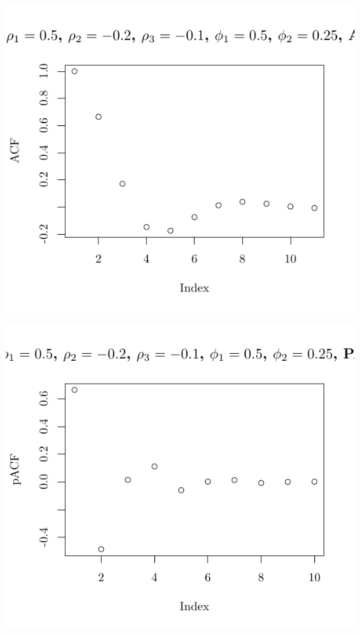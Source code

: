 \documentclass[10pt]{paper}\usepackage[]{graphicx}\usepackage[]{color}
\makeatletter
\def\maxwidth{ %
  \ifdim\Gin@nat@width>\linewidth
    \linewidth
  \else
    \Gin@nat@width
  \fi
}
\newenvironment{knitrout}{}{} %
\makeatother
\begin{document}
\begin{knitrout}
{\centering \includegraphics[width=\maxwidth]{figure/graphics-plotter-183} 

}




{\centering \includegraphics[width=\maxwidth]{figure/graphics-plotter-184} 

}





\end{knitrout}
\end{document}
